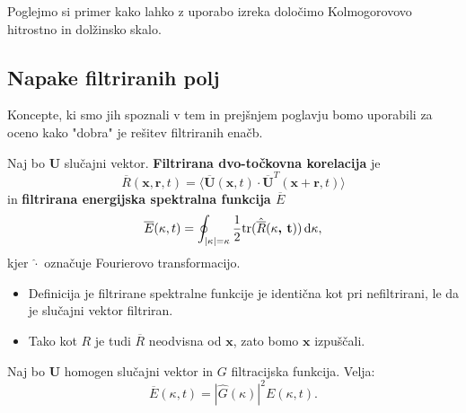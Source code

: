 \documentclass[mat2, tisk]{fmfdelo}
\newcommand{\bd}{\textbf}
\begin{document}
\begin{primer}
Poglejmo si primer kako lahko z uporabo izreka določimo Kolmogorovovo hitrostno in dolžinsko skalo.

\end{primer}

\subsection{Napake filtriranih polj}

Koncepte, ki smo jih spoznali v tem in prejšnjem poglavju bomo 
uporabili za oceno kako "dobra" je rešitev filtriranih enačb.

\begin{definicija}
Naj bo $\bd{U}$ slučajni vektor. \bd{Filtrirana dvo-točkovna korelacija}
je 
\begin{equation}
\overline{R}(\bd{x},\bd{r},t) = \langle \overline{\bd{U}}(\bd{x}, t) \cdot \overline{\bd{U}}^T(\bd{x} + \bd{r}, t) \rangle
\end{equation} 
in \bd{filtrirana energijska spektralna funkcija $\overline{E}$} 
\begin{equation}
\overline{E}(\kappa, t) = \oint_{|\bd{\text{$\kappa$}}| = \kappa} \frac{1}{2} \text{tr}(\hat{\overline{R}}(\bd{\text{$\kappa$}, t})) \dif \bd{\text{$\kappa$}},
\end{equation}
kjer $\hat{\cdot}$ označuje Fourierovo transformacijo.
\end{definicija}

\begin{opomba}
\hfill
\begin{itemize}
  \item Definicija je filtrirane spektralne funkcije je identična kot pri nefiltrirani,
  le da je slučajni vektor filtriran.
  \item Tako kot $R$ je tudi $\overline{R}$ neodvisna od $\bd{x}$, zato bomo $\bd{x}$ izpuščali.
\end{itemize}
\end{opomba}

\begin{lema}
Naj bo $\bd{U}$ homogen slučajni vektor in $G$ filtracijska funkcija. Velja: 
\begin{equation}
\overline{E}(\kappa, t) = |\hat{G}(\kappa)|^2 E(\kappa, t).
\end{equation}
\end{lema}
\end{document}
